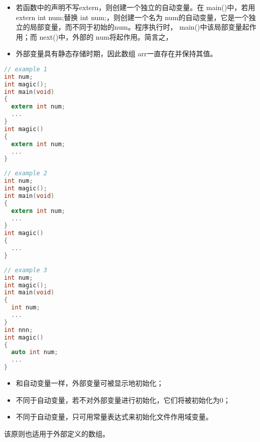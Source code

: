 \begin{frame}[fragile]\ft{\subsecname}
  \begin{itemize}
  \item 若函数中的声明不写extern，则创建一个独立的自动变量。在{ main()}中，若用{ extern int num;}替换{ int num;}，则创建一个名为{ num}的自动变量，它是一个独立的局部变量，而不同于初始的{num}。程序执行时，{ main()}中该局部变量起作用；而{ next()}中，外部的{ num}将起作用。简言之，
  \item 外部变量具有静态存储时期，因此数组{ arr}一直存在并保持其值。
\end{itemize}
\end{frame}

\begin{frame}[fragile]\ft{\subsecname}
  \begin{lstlisting}[language=c,frame=single]
// example 1
int num;
int magic();
int main(void)
{
  extern int num;
  ...
}
int magic()
{
  extern int num;
  ...
}  
  \end{lstlisting}
\end{frame}

\begin{frame}[fragile]\ft{\subsecname}
  \begin{lstlisting}[language=c,frame=single]
// example 2
int num;
int magic();
int main(void)
{
  extern int num;
  ...
}
int magic()
{
  ...
}  
  \end{lstlisting}
\end{frame}

\begin{frame}[fragile]\ft{\subsecname}
  \begin{lstlisting}[language=c,frame=single]
// example 3
int num;
int magic();
int main(void)
{
  int num;
  ...
}
int nnn;
int magic()
{
  auto int num;
  ...
}  
  \end{lstlisting}
\end{frame}

\begin{frame}[fragile]

\begin{itemize}
        \item 和自动变量一样，外部变量可被显示地初始化；
        \item 不同于自动变量，若不对外部变量进行初始化，它们将被初始化为0；
        \item 不同于自动变量，只可用常量表达式来初始化文件作用域变量。
\end{itemize}

该原则也适用于外部定义的数组。
\end{frame}

